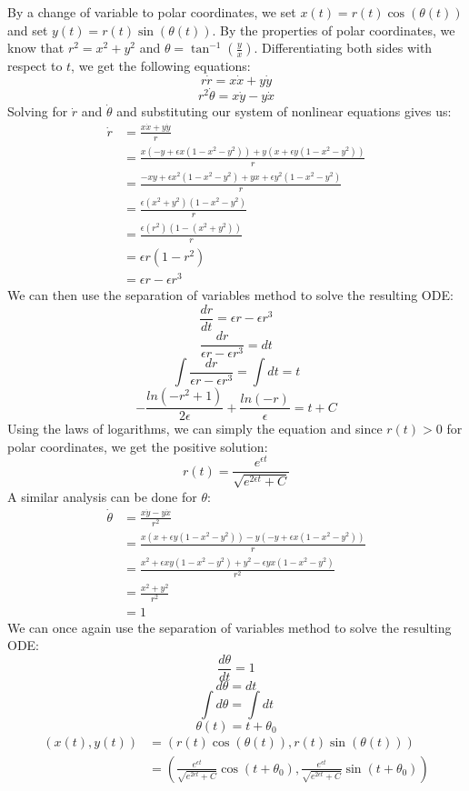 \documentclass[12pt,letterpaper,reqno]{amsart}
\begin{document}
\begin{enumerate}
\begin{flushleft}
By a change of variable to polar coordinates, we set $x(t) = r(t)\cos(\theta(t))$ and set $y(t) = r(t)\sin(\theta(t))$. By the properties of polar coordinates, we know that $r^2 = x^2 + y^2$ and $\theta = \tan^{-1}(\frac{y}{x})$. Differentiating both sides with respect to $t$, we get the following equations:
$$r\dot{r} = x\dot{x} + y\dot{y}$$
$$r^2\dot{\theta} = x\dot{y} - y\dot{x}$$
Solving for $\dot{r}$ and $\dot{\theta}$ and substituting our system of nonlinear equations gives us:
\begin{equation*}
\begin{split}\dot{r} & = \frac{x\dot{x} + y\dot{y}}{r} \\
& = \frac{x(-y + \epsilon x(1 - x^2 - y^2)) + y(x + \epsilon y(1 - x^2 - y^2))}{r} \\
& = \frac{-xy + \epsilon x^2(1 - x^2 - y^2) +yx + \epsilon y^2(1 - x^2 - y^2)}{r} \\
& = \frac{\epsilon (x^2 + y^2)(1 - x^2 - y^2)}{r} \\
& = \frac{\epsilon (r^2)(1 - (x^2 + y^2))}{r} \\
& = \epsilon r(1 - r^2) \\
& = \epsilon r - \epsilon r^3
\end{split}
\end{equation*}
We can then use the separation of variables method to solve the resulting ODE:
$$\frac{dr}{dt} = \epsilon r - \epsilon r^3$$
$$\frac{dr}{\epsilon r - \epsilon r^3} = dt$$
$$\int \frac{dr}{\epsilon r - \epsilon r^3} = \int dt = t$$
$$-\frac{ln(-r^2+1)}{2\epsilon} + \frac{ln(-r)}{\epsilon} = t + C$$
Using the laws of logarithms, we can simply the equation and since $r(t) > 0$ for polar coordinates, we get the positive solution:
$$r(t) = \frac{e^{\epsilon t}}{\sqrt{e^{2 \epsilon t}+ C}}$$
A similar analysis can be done for $\theta$:
\begin{equation*}
\begin{split}\dot{\theta} & = \frac{x\dot{y} - y\dot{x}}{r^2} \\
& = \frac{x(x + \epsilon y(1 - x^2 - y^2)) - y(-y + \epsilon x(1 - x^2 - y^2))}{r} \\
& = \frac{x^2 + \epsilon xy(1 - x^2 - y^2) + y^2 - \epsilon yx(1 - x^2 - y^2)}{r^2} \\
& = \frac{x^2 + y^2}{r^2} \\
& = 1
\end{split}
\end{equation*}
We can once again use the separation of variables method to solve the resulting ODE:
$$\frac{d\theta}{dt} = 1$$
$$d\theta = dt$$
$$\int d\theta = \int dt$$
$$\theta(t) = t + \theta_0$$
\vspace{.15in}
\begin{equation*}
\begin{split}
(x(t),y(t)) & = (r(t)\cos(\theta(t)), r(t)\sin(\theta(t))) \\
& = (\frac{e^{\epsilon t}}{\sqrt{e^{2 \epsilon t}+ C}}\cos(t + \theta_0), \frac{e^{\epsilon t}}{\sqrt{e^{2 \epsilon t}+ C}}\sin(t + \theta_0))
\end{split}
\end{equation*}
\end{flushleft}
\end{enumerate}
\end{document}
